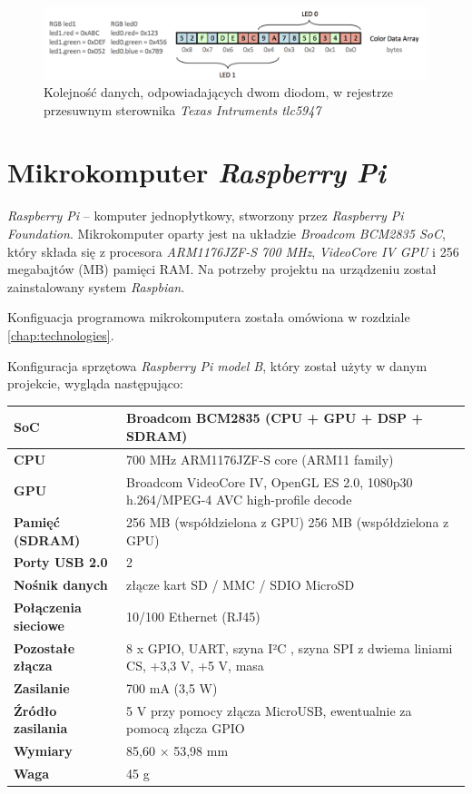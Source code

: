 \documentclass[eng,printmode]{mgr}
\begin{document}
\begin{figure}[!ht]
    \centering
    \includegraphics[width=\textwidth]{Figures/tlc_2leds.png} 
    \caption{Kolejność danych, odpowiadających dwom diodom, w rejestrze przesuwnym sterownika \emph{Texas Intruments tlc5947}}
    \label{fig:tlc_2leds}
\end{figure}



\section{Mikrokomputer \emph{Raspberry Pi}}
\emph{Raspberry Pi} -- komputer jednopłytkowy, stworzony przez \emph{Raspberry Pi Foundation}. Mikrokomputer oparty jest na układzie \emph{Broadcom BCM2835 SoC}, który składa się z procesora \emph{ARM1176JZF-S 700 MHz}, \emph{VideoCore IV GPU} i 256 megabajtów (MB) pamięci RAM. Na potrzeby projektu na urządzeniu został zainstalowany system \emph{Raspbian}. 

Konfiguacja programowa mikrokomputera została omówiona w rozdziale \ref{chap:technologies}.

Konfiguracja sprzętowa \emph{Raspberry Pi model B}, który został użyty w danym projekcie, wygląda następująco:


\setlength{\tabcolsep}{10pt} %
\renewcommand{\arraystretch}{1.5} %
\vspace{0.5cm}
\begin{tabular}{| m{} | m{} |}
  \hline             
  \textbf{SoC} & Broadcom BCM2835 (CPU + GPU + DSP + SDRAM) \\ \hline
  \textbf{CPU} & 700 MHz ARM1176JZF-S core (ARM11 family) \\ \hline
  \textbf{GPU} & Broadcom VideoCore IV, OpenGL ES 2.0, 1080p30 h.264/MPEG-4 AVC high-profile decode \\ \hline
  \textbf{Pamięć (SDRAM)} & 256 MB (współdzielona z GPU)  256 MB (współdzielona z GPU) \\ \hline
  \textbf{Porty USB 2.0} & 2 \\ \hline
  \textbf{Nośnik danych} & złącze kart SD / MMC / SDIO MicroSD \\ \hline
  \textbf{Połączenia sieciowe} & 10/100 Ethernet (RJ45) \\ \hline
  \textbf{Pozostałe złącza} & 8 x GPIO, UART, szyna I²C , szyna SPI z dwiema liniami CS, +3,3 V, +5 V, masa \\ \hline
  \textbf{Zasilanie} & 700 mA (3,5 W) \\ \hline
  \textbf{Źródło zasilania} & 5 V przy pomocy złącza MicroUSB, ewentualnie za pomocą złącza GPIO \\ \hline
  \textbf{Wymiary} & 85,60 × 53,98 mm \\ \hline
  \textbf{Waga} & 45 g \\
  \hline  
\end{tabular}
\end{document}
